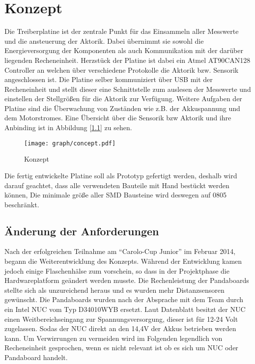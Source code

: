 
\chapter{Konzept}

Die Treiberplatine ist der zentrale Punkt für das Einsammeln aller Messwerte und die ansteuerung der Aktorik. Dabei übernimmt sie sowohl die Energieversorgung der Komponenten als auch
Kommunikation mit der darüber liegenden Recheneinheit. Herzstück der Platine ist dabei ein Atmel AT90CAN128 \textmu Controller an welchen über verschiedene Protokolle die Aktorik bzw. Sensorik
angeschlossen ist. Die Platine selber kommuniziert über USB mit der Recheneinheit und stellt dieser eine Schnittstelle zum auslesen der Messwerte und einstellen der Stellgrößen für die Aktorik
zur Verfügung. Weitere Aufgaben der Platine sind die Überwachung von Zuständen wie z.B. der Akkuspannung und dem Motorstromes. Eine Übersicht über die Sensorik bzw Aktorik und ihre Anbinding ist in 
Abbildung [\ref{fig:konzept}] zu sehen.

\begin{figure}[H]
\centering
\texttt{[image: graph/concept.pdf]}\\
\caption{Konzept}
\label{fig:konzept}
\end{figure}


Die fertig entwickelte Platine soll als Prototyp gefertigt werden, deshalb wird darauf geachtet, dass alle verwendeten Bauteile mit Hand bestückt werden können,
Die minimale größe aller SMD Bausteine wird deswegen auf 0805 beschränkt.


\section{Änderung der Anforderungen}
Nach der erfolgreichen Teilnahme am ``Carolo-Cup Junior'' im Februar 2014, begann die Weiterentwicklung des Konzepts. Während der Entwicklung kamen jedoch
einige Flaschenhälse zum vorschein, so dass in der Projektphase die Hardwareplatform geändert werden musste. Die Rechenleistung der Pandaboards stellte sich
als unzureichend heraus und es wurden mehr Distanzsensoren gewünscht. Die Pandaboards wurden nach der Absprache mit dem Team durch ein Intel NUC vom Typ
D34010WYB ersetzt. Laut Datenblatt \cite{datasheet-nuc} besitzt der NUC einen Weitbereichseingang zur Spannungsversorgung, dieser ist für 12-24 Volt zugelassen.
Sodas der NUC direkt an den 14,4V der Akkus betrieben werden kann.  Um Verwirrungen zu vermeiden wird im Folgenden legendlich von Recheneinheit gesprochen, wenn
es nicht relevant ist ob es sich um NUC oder Pandaboard handelt.






















